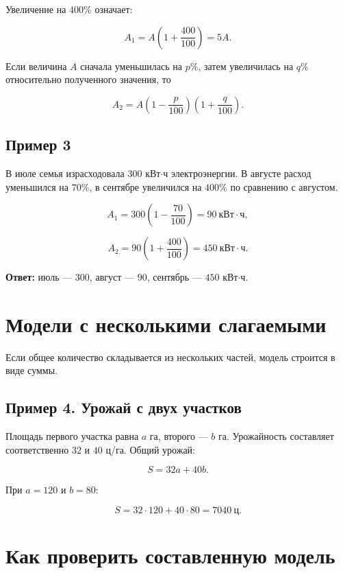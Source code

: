 \documentclass[a4paper,12pt]{article}
\begin{document}
Увеличение на \(400\%\) означает:

\[
A_1=A\left(1+\frac{400}{100}\right)=5A.
\]

Если величина \(A\) сначала уменьшилась на \(p\%\), затем увеличилась на \(q\%\) относительно полученного значения, то

\[
\boxed{A_2=A\left(1-\frac{p}{100}\right)\left(1+\frac{q}{100}\right)}.
\]

\subsection*{Пример 3}

В июле семья израсходовала \(300\) кВт\(\cdot\)ч электроэнергии. В августе расход уменьшился на \(70\%\), в сентябре увеличился на \(400\%\) по сравнению с августом.

\[
A_1=300\left(1-\frac{70}{100}\right)=90\ \text{кВт}\cdot\text{ч},
\]

\[
A_2=90\left(1+\frac{400}{100}\right)=450\ \text{кВт}\cdot\text{ч}.
\]

\textbf{Ответ:} июль --- \(300\), август --- \(90\), сентябрь --- \(450\) кВт\(\cdot\)ч.

\section{Модели с несколькими слагаемыми}

Если общее количество складывается из нескольких частей, модель строится в виде суммы.

\subsection*{Пример 4. Урожай с двух участков}

Площадь первого участка равна \(a\) га, второго --- \(b\) га. Урожайность составляет соответственно \(32\) и \(40\) ц/га. Общий урожай:

\[
\boxed{S=32a+40b}.
\]

При \(a=120\) и \(b=80\):

\[
S=32\cdot120+40\cdot80=7040\ \text{ц}.
\]

\section{Как проверить составленную модель}
\end{document}
